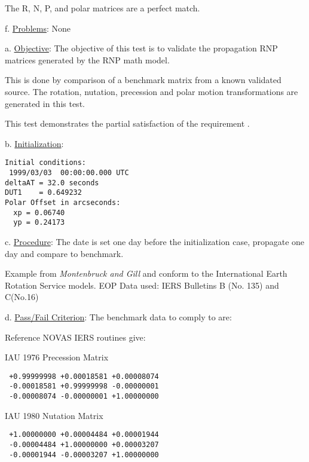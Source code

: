 The R, N, P, and
polar matrices are a perfect match.\newline

f. \underline{ Problems}:\newline
None



\label{test:rnp_test2}

a. \underline{Objective}:\newline
The objective of this test is to validate the propagation
RNP matrices generated by the RNP math model.

This is done by comparison of a benchmark matrix from a
known validated source.  The rotation, nutation, precession
and polar motion transformations are generated in this test.

This test demonstrates the partial satisfaction
of the requirement .

b. \underline{Initialization}:
\begin{verbatim}
Initial conditions:
 1999/03/03  00:00:00.000 UTC
deltaAT = 32.0 seconds
DUT1    = 0.649232
Polar Offset in arcseconds:
  xp = 0.06740
  yp = 0.24173
\end{verbatim}

c. \underline{Procedure}:\newline
The date is set one day before the initialization case,
propagate one day and compare to benchmark.

Example from {\em Montenbruck and Gill} \cite{MG}
and conform to the International Earth Rotation Service models.
EOP Data used: IERS Bulletins B (No. 135) and C(No.16)\newline

d. \underline{Pass/Fail Criterion}:\newline
The benchmark data to comply to are:

Reference NOVAS \cite{NOVAS} IERS routines give:

IAU 1976 Precession Matrix
\begin{verbatim}
 +0.99999998 +0.00018581 +0.00008074
 -0.00018581 +0.99999998 -0.00000001
 -0.00008074 -0.00000001 +1.00000000
\end{verbatim}

IAU 1980 Nutation Matrix
\begin{verbatim}
 +1.00000000 +0.00004484 +0.00001944
 -0.00004484 +1.00000000 +0.00003207
 -0.00001944 -0.00003207 +1.00000000
\end{verbatim}

